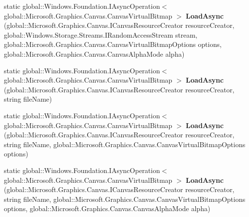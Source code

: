 \begin{DoxyCompactItemize}
\item 
\mbox{\label{class_microsoft_1_1_graphics_1_1_canvas_1_1_canvas_virtual_bitmap_abba7eac1de7fc7da41f8546a18aef233}} 
static global\+::\+Windows.\+Foundation.\+I\+Async\+Operation$<$ global\+::\+Microsoft.\+Graphics.\+Canvas.\+Canvas\+Virtual\+Bitmap $>$ {\bfseries Load\+Async} (global\+::\+Microsoft.\+Graphics.\+Canvas.\+I\+Canvas\+Resource\+Creator resource\+Creator, global\+::\+Windows.\+Storage.\+Streams.\+I\+Random\+Access\+Stream stream, global\+::\+Microsoft.\+Graphics.\+Canvas.\+Canvas\+Virtual\+Bitmap\+Options options, global\+::\+Microsoft.\+Graphics.\+Canvas.\+Canvas\+Alpha\+Mode alpha)
\item 
\mbox{\label{class_microsoft_1_1_graphics_1_1_canvas_1_1_canvas_virtual_bitmap_a8596f4617ef7a7e9c1a1464d4674e40c}} 
static global\+::\+Windows.\+Foundation.\+I\+Async\+Operation$<$ global\+::\+Microsoft.\+Graphics.\+Canvas.\+Canvas\+Virtual\+Bitmap $>$ {\bfseries Load\+Async} (global\+::\+Microsoft.\+Graphics.\+Canvas.\+I\+Canvas\+Resource\+Creator resource\+Creator, string file\+Name)
\item 
\mbox{\label{class_microsoft_1_1_graphics_1_1_canvas_1_1_canvas_virtual_bitmap_a8f0bf16c94a9957cd9b4f30b7c8369f8}} 
static global\+::\+Windows.\+Foundation.\+I\+Async\+Operation$<$ global\+::\+Microsoft.\+Graphics.\+Canvas.\+Canvas\+Virtual\+Bitmap $>$ {\bfseries Load\+Async} (global\+::\+Microsoft.\+Graphics.\+Canvas.\+I\+Canvas\+Resource\+Creator resource\+Creator, string file\+Name, global\+::\+Microsoft.\+Graphics.\+Canvas.\+Canvas\+Virtual\+Bitmap\+Options options)
\item 
\mbox{\label{class_microsoft_1_1_graphics_1_1_canvas_1_1_canvas_virtual_bitmap_a72cf413902f0758c4707d6fc9c560914}} 
static global\+::\+Windows.\+Foundation.\+I\+Async\+Operation$<$ global\+::\+Microsoft.\+Graphics.\+Canvas.\+Canvas\+Virtual\+Bitmap $>$ {\bfseries Load\+Async} (global\+::\+Microsoft.\+Graphics.\+Canvas.\+I\+Canvas\+Resource\+Creator resource\+Creator, string file\+Name, global\+::\+Microsoft.\+Graphics.\+Canvas.\+Canvas\+Virtual\+Bitmap\+Options options, global\+::\+Microsoft.\+Graphics.\+Canvas.\+Canvas\+Alpha\+Mode alpha)

\end{DoxyCompactItemize}
